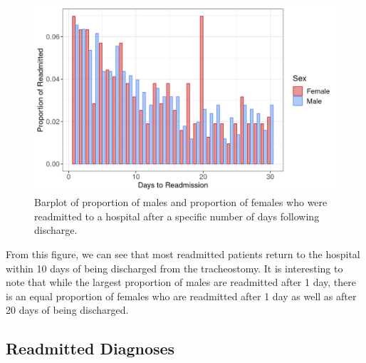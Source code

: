 \documentclass[sn-basic,pdflatex]{sn-jnl}
\theoremstyle{remark}
\theoremstyle{definition}
\begin{document}
\begin{figure}[H]

{\centering \includegraphics[width=1\linewidth]{figures/daysto} 

}

\caption{Barplot of proportion of males and proportion of females who were readmitted to a hospital after a specific number of days following discharge.}\label{fig:daysto}
\end{figure}

From this figure, we can see that most readmitted patients return to the
hospital within 10 days of being discharged from the tracheostomy. It is
interesting to note that while the largest proportion of males are
readmitted after 1 day, there is an equal proportion of females who are
readmitted after 1 day as well as after 20 days of being discharged.

\hypertarget{sec4C}{%
\subsection{Readmitted Diagnoses}\label{sec4C}}
\end{document}
